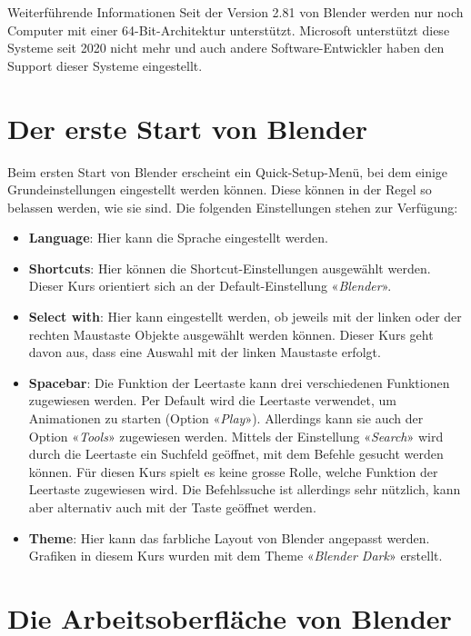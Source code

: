 \documentclass[
]{book}
\providecommand{\tightlist}{%
  \setlength{\itemsep}{0pt}\setlength{\parskip}{0pt}}\usepackage{longtable,booktabs,array}
\newcommand{\kbd}[1]{\fbox{\texttt{#1}}}
\begin{document}
\begin{tipp}{Weiterführende Informationen}
Seit der Version 2.81 von Blender werden nur noch Computer mit einer 64-Bit-Architektur unterstützt. Microsoft unterstützt diese Systeme seit 2020 nicht mehr und auch andere Software-Entwickler haben den Support dieser Systeme eingestellt.
\end{tipp}

\section{Der erste Start von Blender}\label{der-erste-start-von-blender}

Beim ersten Start von Blender erscheint ein Quick-Setup-Menü, bei dem
einige Grundeinstellungen eingestellt werden können. Diese können in der
Regel so belassen werden, wie sie sind. Die folgenden Einstellungen
stehen zur Verfügung:

\begin{itemize}
\tightlist
\item
  \textbf{Language}: Hier kann die Sprache eingestellt werden.
\item
  \textbf{Shortcuts}: Hier können die Shortcut-Einstellungen ausgewählt
  werden. Dieser Kurs orientiert sich an der Default-Einstellung
  «\emph{Blender}».
\item
  \textbf{Select with}: Hier kann eingestellt werden, ob jeweils mit der
  linken oder der rechten Maustaste Objekte ausgewählt werden können.
  Dieser Kurs geht davon aus, dass eine Auswahl mit der linken Maustaste
  erfolgt.
\item
  \textbf{Spacebar}: Die Funktion der Leertaste kann drei verschiedenen
  Funktionen zugewiesen werden. Per Default wird die Leertaste
  verwendet, um Animationen zu starten (Option «\emph{Play}»).
  Allerdings kann sie auch der Option «\emph{Tools}» zugewiesen werden.
  Mittels der Einstellung «\emph{Search}» wird durch die Leertaste ein
  Suchfeld geöffnet, mit dem Befehle gesucht werden können. Für diesen
  Kurs spielt es keine grosse Rolle, welche Funktion der Leertaste
  zugewiesen wird. Die Befehlssuche ist allerdings sehr nützlich, kann
  aber alternativ auch mit der Taste \kbd{F3} geöffnet werden.
\item
  \textbf{Theme}: Hier kann das farbliche Layout von Blender angepasst
  werden. Grafiken in diesem Kurs wurden mit dem Theme «\emph{Blender
  Dark}» erstellt.
\end{itemize}

\section{Die Arbeitsoberfläche von
Blender}\label{die-arbeitsoberfluxe4che-von-blender}
\end{document}
